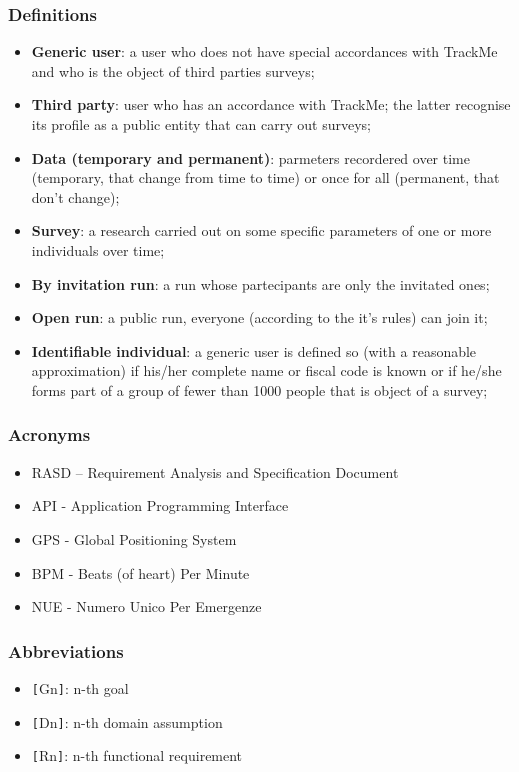 \subsubsection{Definitions}
\begin{itemize}
\item \textbf{Generic user}: a user who does not have special accordances with TrackMe and who is the object of third parties surveys;
\item \textbf{Third party}: user who has an accordance with TrackMe; the latter recognise its profile as a public entity that can carry out surveys;
\item \textbf{Data (temporary and permanent)}: parmeters recordered over time (temporary, that change from time to time) or once for all (permanent, that don't change);
\item \textbf{Survey}: a research carried out on some specific parameters of one or more individuals over time;
\item \textbf{By invitation run}: a run whose partecipants are only the invitated ones;
\item \textbf{Open run}: a public run, everyone (according to the it's rules) can join it;
\item \textbf{Identifiable individual}: a generic user is defined so (with a reasonable approximation) if his/her complete name or fiscal code is known or if he/she forms part of a group of fewer than 1000 people that is object of a survey;
\end{itemize}
\subsubsection{Acronyms}
\begin{itemize}
\item RASD – Requirement Analysis and Specification Document
\item API - Application Programming Interface
\item GPS - Global Positioning System
\item BPM - Beats (of heart) Per Minute
\item NUE - Numero Unico Per Emergenze
\end{itemize}
\subsubsection{Abbreviations}
\begin{itemize}
\item \verb|[|Gn\verb|]|: n-th goal
\item \verb|[|Dn\verb|]|: n-th domain assumption
\item \verb|[|Rn\verb|]|: n-th functional requirement
\end{itemize}

